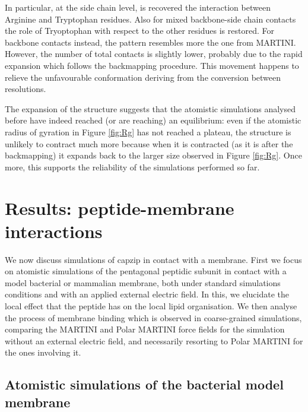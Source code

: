 %
In particular, at the side chain level, is recovered the interaction between Arginine and Tryptophan residues. Also for mixed backbone-side chain contacts the role of Tryoptophan with respect to the other residues is restored. For backbone contacts instead, the pattern resembles more the one from MARTINI. However, the number of total contacts is slightly lower, probably due to the rapid expansion which follows the backmapping procedure. This movement happens to relieve the unfavourable conformation deriving from the conversion between resolutions.

The expansion of the structure suggests that the atomistic simulations analysed before have indeed reached (or are reaching) an equilibrium: even if the atomistic radius of gyration in Figure \ref{fig:Rg} has not reached a plateau, the structure is unlikely to contract much more because when it is contracted (as it is after the backmapping) it expands back to the larger size observed in Figure \ref{fig:Rg}.
Once more, this supports the reliability of the simulations performed so far.



\section{Results: peptide-membrane interactions}

We now discuss simulations of capzip in contact with a membrane. First we focus on atomistic simulations of the pentagonal peptidic subunit in contact with a model bacterial or mammalian membrane, both under standard simulations conditions and with an applied external electric field. In this, we elucidate the local effect that the peptide has on the local lipid organisation.
%
We then analyse the process of membrane binding which is observed in coarse-grained simulations, comparing the MARTINI and Polar MARTINI force fields for the simulation without an external electric field, and necessarily resorting to Polar MARTINI for the ones involving it. 


\subsection{Atomistic simulations of the bacterial model membrane} \label{sec:lip_atom_bact}

